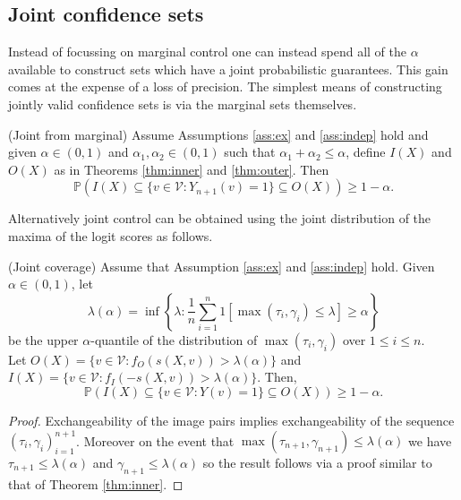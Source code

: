 \subsection{Joint confidence sets}\label{SS:joint}
Instead of focussing on marginal control one can instead spend all of the $\alpha$ available to construct sets which have a joint probabilistic guarantees. This gain comes at the expense of a loss of precision. The simplest means of constructing jointly valid confidence sets is via the marginal sets themselves.
\begin{corollary}\label{cor:weighting}
	(Joint from marginal) Assume Assumptions \ref{ass:ex} and \ref{ass:indep} hold and given $\alpha \in (0,1)$ and $\alpha_1, \alpha_2 \in (0,1)$ such that $\alpha_1 + \alpha_2 \leq \alpha$, define $I(X)$ and  $O(X)$ as in Theorems \ref{thm:inner} and \ref{thm:outer}. Then 
	\begin{equation}
		\mathbb{P}\left( I(X) \subseteq \lbrace v\in \mathcal{V}: Y_{n+1}(v) = 1 \rbrace \subseteq O(X)  \right) \geq 1 - \alpha. 
	\end{equation}
\end{corollary}
Alternatively joint control can be obtained using the joint distribution of the maxima of the logit scores as follows.
\begin{theorem}\label{thm:joint}
	(Joint coverage) Assume that Assumption \ref{ass:ex} and \ref{ass:indep}  hold. Given $\alpha \in (0,1)$, let 
	\begin{equation*}
		\lambda(\alpha) = \inf\left\lbrace \lambda: \frac{1}{n} \sum_{i = 1}^n 1\left[ \max(\tau_i, \gamma_i) \leq \lambda \right] \geq \alpha \right\rbrace
	\end{equation*}
 	be the upper $\alpha$-quantile of the distribution of $\max(\tau_i, \gamma_i)$ over $1 \leq i \leq n$.\\ Let $O(X) = \lbrace v \in \mathcal{V}: f_O(s(X,v)) >  \lambda(\alpha) \rbrace $ and $I(X) = \lbrace v \in \mathcal{V}: f_I(-s(X,v)) >	\lambda(\alpha) \rbrace $. Then,
\begin{equation}\label{eq:probstat}
	\mathbb{P}\left( I(X) \subseteq \lbrace v\in \mathcal{V}: Y(v) = 1 \rbrace \subseteq O(X) \right) \geq 1 - \alpha.
\end{equation}
\end{theorem}
\begin{proof}
	Exchangeability of the image pairs implies exchangeability of the sequence $(\tau_i, \gamma_i)_{i = 1}^{n+1}$. Moreover on the event that $\max(\tau_{n+1}, \gamma_{n+1}) \leq \lambda(\alpha)$ we have $\tau_{n+1} \leq \lambda(\alpha)$ and $\gamma_{n+1} \leq \lambda(\alpha)$ so the result follows via a proof similar to that of Theorem \ref{thm:inner}.
\end{proof}

